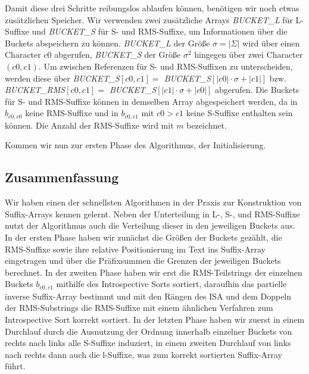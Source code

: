 Damit diese drei Schritte reibungslos ablaufen können, benötigen wir noch etwas zusätzlichen Speicher. Wir verwenden zwei zusätzliche Arrays \textit{BUCK\-ET\_L} für L-Suffixe und \textit{BUCK\-ET\_S} für S- und RMS-Suffixe, um Informationen über die Buckets abspeichern zu können. \textit{BUCK\-ET\_L} der Größe $\sigma = |\Sigma |$ wird über einen Character $c0$ abgerufen, \textit{BUCK\-ET\_S} der Größe $\sigma ^2$ hingegen über zwei Character $(c0,c1)$. Um zwischen Referenzen für S- und RMS-Suffixen zu unterscheiden, werden diese über \textit{BUCK\-ET\_S$[c0,c1] = $ BUCK\-ET\_S$[|c0| \cdot \sigma + |c1|]$} bzw. \textit{BUCK\-ET\_RMS$[c0,c1] = $ BUCK\-ET\_S$[|c1| \cdot \sigma + |c0|]$} abgerufen. Die Buckets für S- und RMS-Suffixe können in demselben Array abgespeichert werden, da in $b_{c0,c0}$ keine RMS-Suffixe und in $b_{c0,c1}$ mit $c0 > c1$ keine S-Suffixe enthalten sein können. Die Anzahl der RMS-Suffixe wird mit $m$ bezeichnet.

Kommen wir nun zur ersten Phase des Algorithmus, der Initialisierung.





\subsection{Zusammenfassung}
Wir haben einen der schnellsten Algorithmen in der Praxis zur Konstruktion von Suffix-Arrays kennen gelernt. Neben der Unterteilung in L-, S-, und RMS-Suffixe nutzt der Algorithmus auch die Verteilung dieser in den jeweiligen Buckets aus. In der ersten Phase haben wir zunächst die Größen der Buckets gezählt, die RMS-Suffixe sowie ihre relative Positionierung im Text ins Suffix-Array eingetragen und über die Präfixsummen die Grenzen der jeweiligen Buckets berechnet. In der zweiten Phase haben wir erst die RMS-Teilstrings der einzelnen Buckets $b_{c0,c1}$ mithilfe des Introspective Sorts sortiert, daraufhin das partielle inverse Suffix-Array bestimmt und mit den Rängen des ISA und dem Doppeln der RMS-Substrings die RMS-Suffixe mit einem ähnlichen Verfahren zum Introspective Sort korrekt sortiert. In der letzten Phase haben wir zuerst in einem Durchlauf durch die Ausnutzung der Ordnung innerhalb einzelner Buckets von rechts nach links alle S-Suffixe induziert, in einem zweiten Durchlauf von links nach rechts dann auch die l-Suffixe, was zum korrekt sortierten Suffix-Array führt. 



